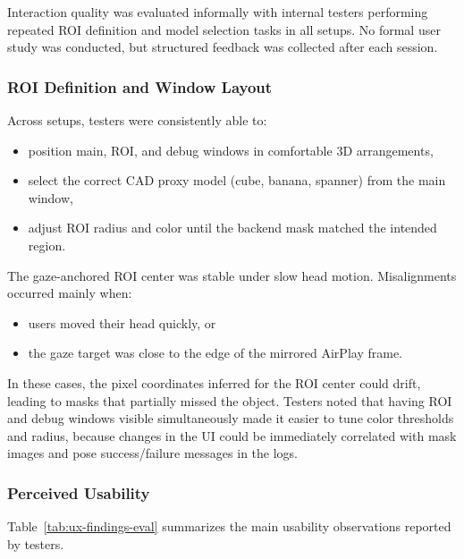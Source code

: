 Interaction quality was evaluated informally with internal testers performing repeated ROI definition and model selection tasks in all setups. No formal user study was conducted, but structured feedback was collected after each session.

\subsubsection{ROI Definition and Window Layout}

Across setups, testers were consistently able to:

\begin{itemize}
    \item position main, ROI, and debug windows in comfortable 3D arrangements,
    \item select the correct CAD proxy model (cube, banana, spanner) from the main window,
    \item adjust ROI radius and color until the backend mask matched the intended region.
\end{itemize}

The gaze-anchored ROI center was stable under slow head motion. Misalignments occurred mainly when:

\begin{itemize}
    \item users moved their head quickly, or
    \item the gaze target was close to the edge of the mirrored AirPlay frame.
\end{itemize}

In these cases, the pixel coordinates inferred for the ROI center could drift, leading to masks that partially missed the object. Testers noted that having ROI and debug windows visible simultaneously made it easier to tune color thresholds and radius, because changes in the UI could be immediately correlated with mask images and pose success/failure messages in the logs.

\subsubsection{Perceived Usability}

Table~\ref{tab:ux-findings-eval} summarizes the main usability observations reported by testers.

